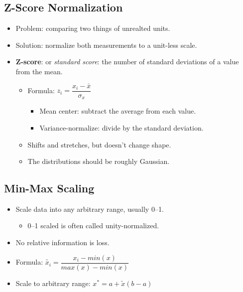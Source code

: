 \documentclass[12pt,a4paper]{article}
\begin{document}
\subsection{Z-Score Normalization}
\begin{itemize}
    \item Problem: comparing two things of unrealted units.
    \item Solution: normalize both measurements to a unit-less scale.
    \item \textbf{Z-score}: or \textit{standard score}: the {\color{o-Sun}number of standard deviations} of a value from the mean.
        \begin{itemize}
            \item Formula: {\color{o-Sun}\(z_i = \dfrac{x_i - \bar{x}}{\sigma_x}\)}
                \begin{itemize}
                    \item Mean center: subtract the average from each value.
                    \item Variance-normalize: divide by the standard deviation.
                \end{itemize}
            \item Shifts and stretches, but doesn't change shape.
            \item The distributions should be {\color{o-Sun}roughly Gaussian}.
        \end{itemize}
\end{itemize}

\subsection{Min-Max Scaling}
\begin{itemize}
    \item Scale data into any arbitrary range, usually 0--1.
        \begin{itemize}
            \item 0--1 scaled is often called unity-normalized.
        \end{itemize}
    \item No relative information is loss.
    \item Formula: {\color{o-Sun}\(\tilde{x_i}=\dfrac{x_i-min(x)}{max(x)-min(x)}\)}
    \item Scale to arbitrary range: \(x^* = a + \tilde{x}(b-a)\)
\end{itemize}
\end{document}
